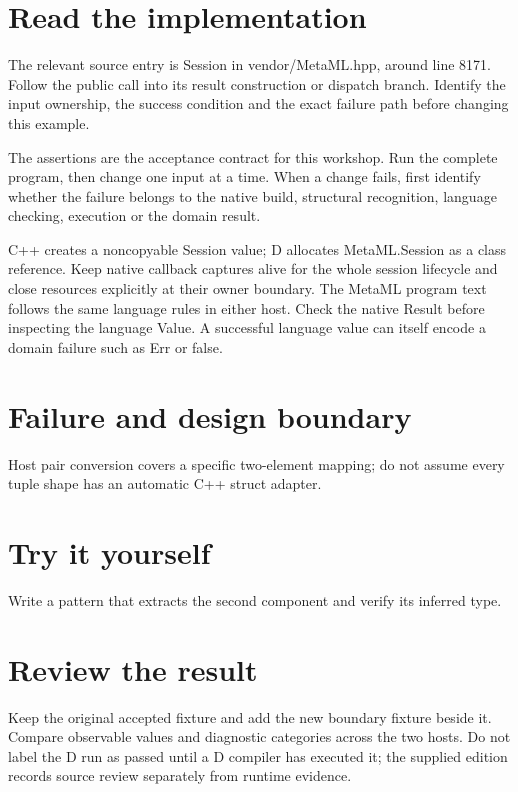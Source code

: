 \section*{Read the implementation}
The relevant source entry is Session in vendor/MetaML.hpp, around line 8171. Follow the public call into its result construction or dispatch branch. Identify the input ownership, the success condition and the exact failure path before changing this example.

The assertions are the acceptance contract for this workshop. Run the complete program, then change one input at a time. When a change fails, first identify whether the failure belongs to the native build, structural recognition, language checking, execution or the domain result.

\clearpage
{}
C++ creates a noncopyable Session value; D allocates MetaML.Session as a class reference. Keep native callback captures alive for the whole session lifecycle and close resources explicitly at their owner boundary. The MetaML program text follows the same language rules in either host. Check the native Result before inspecting the language Value. A successful language value can itself encode a domain failure such as Err or false.


\section*{Failure and design boundary}
Host pair conversion covers a specific two-element mapping; do not assume every tuple shape has an automatic C++ struct adapter.

\section*{Try it yourself}
Write a pattern that extracts the second component and verify its inferred type.

\section*{Review the result}
Keep the original accepted fixture and add the new boundary fixture beside it. Compare observable values and diagnostic categories across the two hosts. Do not label the D run as passed until a D compiler has executed it; the supplied edition records source review separately from runtime evidence.

